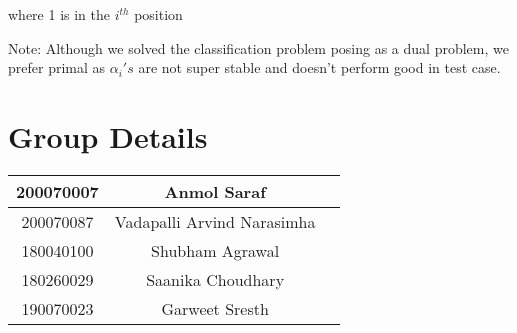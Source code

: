 \documentclass[11pt, twosides]{article}
\begin{document}
where 1 is in the $i^{th}$ position 


Note: 
Although we solved the classification problem posing as a dual problem, we prefer primal as $\alpha_i's$ are not super stable and doesn't perform good in test case. 






\section{Group Details}


\begin{center}
\begin{tabular}{ |c|c|c| } 
 \hline
 200070007 & Anmol Saraf  \\ 
 \hline
 200070087 & Vadapalli Arvind Narasimha  \\  
 \hline
 180040100 & Shubham Agrawal \\ 
 \hline
 180260029 & Saanika Choudhary \\
 \hline
 190070023 & Garweet Sresth \\
 \hline
\end{tabular}
\end{center}
\end{document}
